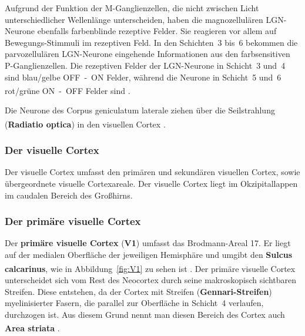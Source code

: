Aufgrund der Funktion der M-Ganglienzellen, die nicht zwischen Licht unterschiedlicher Wellenlänge unterscheiden, haben die magnozellulären LGN-Neurone ebenfalls farbenblinde rezeptive Felder. Sie reagieren vor allem auf Bewegungs-Stimmuli im rezeptiven Feld. In den Schichten~3 bis~6 bekommen die parvozellulären LGN-Neurone eingehende Informationen aus den farbsensitiven P-Ganglienzellen. Die rezeptiven Felder der LGN-Neurone in Schicht~3 und~4 sind blau/gelbe OFF~-~ON Felder, während die Neurone in Schicht~5 und~6 rot/grüne ON~-~OFF Felder sind \textsuperscript{\cite[Kap.~18]{smith2008biology}}.

Die Neurone des Corpus geniculatum laterale ziehen über die Seilstrahlung (\textbf{Radiatio optica})  in den visuellen Cortex \textsuperscript{\cite[Kap.~8.1]{trepel2011neuroanatomie}}.


\subsubsection*{Der visuelle Cortex}

Der visuelle Cortex umfasst den primären und sekundären visuellen Cortex, sowie übergeordnete visuelle Cortexareale. Der visuelle Cortex liegt im Okzipitallappen im caudalen Bereich des Großhirns. 


\subsubsection*{Der primäre visuelle Cortex}

Der \textbf{primäre visuelle Cortex} (\textbf{V1})  umfasst das Brodmann-Areal 17. Er liegt auf der medialen Oberfläche der jeweiligen Hemisphäre und umgibt den \textbf{Sulcus calcarinus}, wie in Abbildung~\ref{fig:V1} zu sehen ist \textsuperscript{\cite[Kap.~10]{neurowissenschaften_baer}}.
Der primäre visuelle Cortex unterscheidet sich vom Rest des Neocortex durch seine makroskopisch sichtbaren Streifen. Diese entstehen, da der Cortex mit Streifen (\textbf{Gennari-Streifen}) myelinisierter Fasern, die parallel zur Oberfläche in Schicht~4 verlaufen, durchzogen ist. Aus diesem Grund nennt man diesen Bereich des Cortex auch \textbf{Area striata} \textsuperscript{\cite[Kap.~18]{smith2008biology}}.

